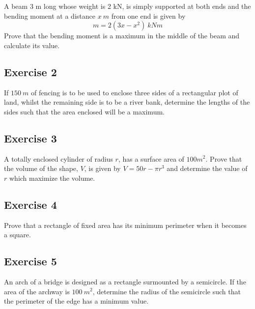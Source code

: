 \documentclass[
  11pt,
  oneside]{book}
\newcommand{\slide}{}
\theoremstyle{definition}
\theoremstyle{definition}
\theoremstyle{definition}
\theoremstyle{definition}
\theoremstyle{remark}
\begin{document}
A beam 3 m long whose weight is 2 kN, is simply supported at both ends and the bending moment at a distance \(x\ m\) from one end is given by
\[
m = 2(3x - x^2)\ kNm
\]
Prove that the bending moment is a maximum in the middle of the beam and calculate its value.

\slide

\subsection*{Exercise 2}\label{exercise-2-4}

If \(150\ m\) of fencing is to be used to enclose three sides of a rectangular plot of land, whilst the remaining side is to be a river bank, determine the lengths of the sides such that the area enclosed will be a maximum.

\slide

\subsection*{Exercise 3}\label{exercise-3-3}

A totally enclosed cylinder of radius \(r\), has a surface area of \(100 m^2\). Prove that the volume of the shape, \(V\), is given by \(V = 50r - \pi r^3\) and determine the value of \(r\) which maximize the volume.

\slide

\subsection*{Exercise 4}\label{exercise-4-3}

Prove that a rectangle of fixed area has its minimum perimeter when it becomes a square.

\slide

\subsection*{Exercise 5}\label{exercise-5-2}

An arch of a bridge is designed as a rectangle surmounted by a semicircle. If the area of the archway is \(100\ m^2\), determine the radius of the semicircle such that the perimeter of the edge has a minimum value.

\slide
\end{document}
